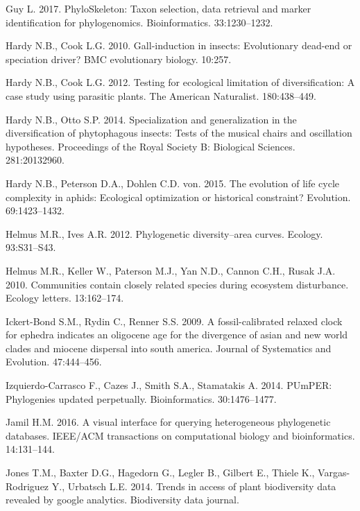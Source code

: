 \documentclass[]{article}
\begin{document}
\leavevmode\hypertarget{ref-guy2017phyloskeleton}{}%
Guy L. 2017. PhyloSkeleton: Taxon selection, data retrieval and marker identification for phylogenomics. Bioinformatics. 33:1230--1232.

\leavevmode\hypertarget{ref-hardy2010gall}{}%
Hardy N.B., Cook L.G. 2010. Gall-induction in insects: Evolutionary dead-end or speciation driver? BMC evolutionary biology. 10:257.

\leavevmode\hypertarget{ref-hardy2012testing}{}%
Hardy N.B., Cook L.G. 2012. Testing for ecological limitation of diversification: A case study using parasitic plants. The American Naturalist. 180:438--449.

\leavevmode\hypertarget{ref-hardy2014specialization}{}%
Hardy N.B., Otto S.P. 2014. Specialization and generalization in the diversification of phytophagous insects: Tests of the musical chairs and oscillation hypotheses. Proceedings of the Royal Society B: Biological Sciences. 281:20132960.

\leavevmode\hypertarget{ref-hardy2015evolution}{}%
Hardy N.B., Peterson D.A., Dohlen C.D. von. 2015. The evolution of life cycle complexity in aphids: Ecological optimization or historical constraint? Evolution. 69:1423--1432.

\leavevmode\hypertarget{ref-helmus2012phylogenetic}{}%
Helmus M.R., Ives A.R. 2012. Phylogenetic diversity--area curves. Ecology. 93:S31--S43.

\leavevmode\hypertarget{ref-helmus2010communities}{}%
Helmus M.R., Keller W., Paterson M.J., Yan N.D., Cannon C.H., Rusak J.A. 2010. Communities contain closely related species during ecosystem disturbance. Ecology letters. 13:162--174.

\leavevmode\hypertarget{ref-ickert2009fossil}{}%
Ickert-Bond S.M., Rydin C., Renner S.S. 2009. A fossil-calibrated relaxed clock for ephedra indicates an oligocene age for the divergence of asian and new world clades and miocene dispersal into south america. Journal of Systematics and Evolution. 47:444--456.

\leavevmode\hypertarget{ref-izquierdo2014pumper}{}%
Izquierdo-Carrasco F., Cazes J., Smith S.A., Stamatakis A. 2014. PUmPER: Phylogenies updated perpetually. Bioinformatics. 30:1476--1477.

\leavevmode\hypertarget{ref-jamil2016visual}{}%
Jamil H.M. 2016. A visual interface for querying heterogeneous phylogenetic databases. IEEE/ACM transactions on computational biology and bioinformatics. 14:131--144.

\leavevmode\hypertarget{ref-jones2014trends}{}%
Jones T.M., Baxter D.G., Hagedorn G., Legler B., Gilbert E., Thiele K., Vargas-Rodriguez Y., Urbatsch L.E. 2014. Trends in access of plant biodiversity data revealed by google analytics. Biodiversity data journal.
\end{document}

